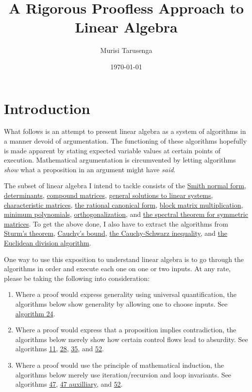 \documentclass[twocolumn]{article}
\begin{document}
	\title{A Rigorous Proofless Approach to Linear Algebra}
	\author{Murisi Tarusenga}
	\date{\today{} \currenttime}
	\maketitle
	\section{Introduction}
		What follows is an attempt to present linear algebra as a system of algorithms in a manner devoid of argumentation. The functioning of these algorithms hopefully is made apparent by stating expected variable values at certain points of execution. Mathematical argumentation is circumvented by letting algorithms \textit{show} what a proposition in an argument might have \textit{said}.
		
		The subset of linear algebra I intend to tackle consists of the \hyperref[sec:algorithm 3]{Smith normal form}, \hyperref[sec:algorithm 8]{determinants}, \hyperref[sec:algorithm 13]{compound matrices}, \hyperref[sec:algorithm 24]{general solutions to linear systems}, \hyperref[sec:algorithm 26]{characteristic matrices}, \hyperref[sec:algorithm 29]{the rational canonical form}, \hyperref[sec:algorithm 31]{block matrix multiplication}, \hyperref[sec:algorithm 32]{minimum polynomials}, \hyperref[sec:algorithm 50]{orthogonalization}, and \hyperref[sec:algorithm 56]{the spectral theorem for symmetric matrices}. To get the above done, I also have to extract the algorithms from \hyperref[sec:algorithm 42]{Sturm's theorem}, \hyperref[sec:algorithm 40]{Cauchy's bound}, \hyperref[sec:algorithm 51]{the Cauchy-Schwarz inequality}, and \hyperref[sec:algorithm 46]{the Euclidean division algorithm}.
		
		One way to use this exposition to understand linear algebra is to go through the algorithms in order and execute each one on one or two inputs. At any rate, please be taking the following into consideration:
		\begin{enumerate}
			\item Where a proof would express generality using universal quantification, the algorithms below show generality by allowing one to choose inputs. See \hyperref[sec:algorithm 24]{algorithm 24}.
			\item Where a proof would express that a proposition implies contradiction, the algorithms below merely show how certain control flows lead to absurdity. See algorithms \hyperref[sec:algorithm 11]{11}, \hyperref[sec:algorithm 28]{28}, \hyperref[sec:algorithm 35]{35}, and \hyperref[sec:algorithm 52]{52}.
			\item Where a proof would use the principle of mathematical induction, the algorithms below merely use iteration/recursion and loop invariants. See algorithms \hyperref[sec:algorithm 47]{47}, \hyperref[sec:algorithm 47]{47 auxilliary}, and \hyperref[sec:algorithm 52]{52}.
		\end{enumerate}
		
\end{document}
